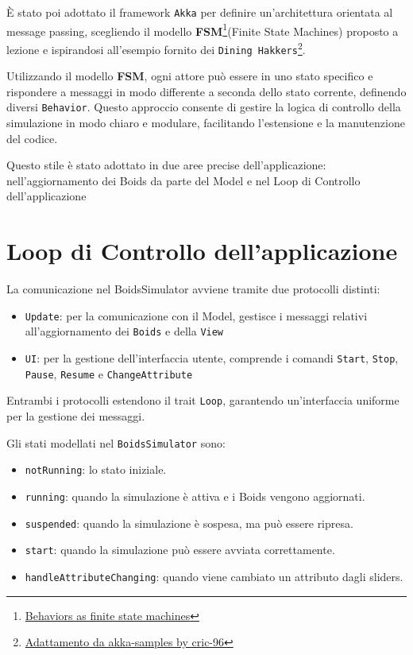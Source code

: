 \documentclass[a4paper,12pt]{report}
\begin{document}
    È stato poi adottato il framework \texttt{Akka} per definire un'architettura orientata al message passing, scegliendo il modello \textbf{FSM}\footnote{\href{https://doc.akka.io/libraries/akka-core/current/typed/fsm.html}{Behaviors as finite state machines}}(Finite State Machines) proposto a lezione e ispirandosi all'esempio fornito dei \texttt{Dining Hakkers}\footnote{\href{https://github.com/cric96/pcd-lab-akka-actors/blob/63e4f3273ef1550c1c744d1f7332b7ce935223ab/src/main/scala/it/unibo/pcd/akka/basics/e07fsm/DiningHakkers.scala}{Adattamento da akka-samples by cric-96}}.
    
    Utilizzando il modello \textbf{FSM}, ogni attore può essere in uno stato specifico e rispondere a messaggi in modo differente a seconda dello stato corrente, definendo diversi  \texttt{Behavior}. Questo approccio consente di gestire la logica di controllo della simulazione in modo chiaro e modulare, facilitando l'estensione e la manutenzione del codice.

    Questo stile è stato adottato in due aree precise dell'applicazione: nell'aggiornamento dei Boids da parte del Model e nel Loop di Controllo dell'applicazione
    
    \section{Loop di Controllo dell'applicazione}
        La comunicazione nel BoidsSimulator avviene tramite due protocolli distinti:
        \begin{itemize}
            \item \texttt{Update}: per la comunicazione con il Model, gestisce i messaggi relativi all'aggiornamento dei \texttt{Boids} e della \texttt{View} 
            \item \texttt{UI}: per la gestione dell'interfaccia utente, comprende i comandi \texttt{Start}, \texttt{Stop}, \texttt{Pause}, \texttt{Resume} e \texttt{ChangeAttribute}
        \end{itemize}

        Entrambi i protocolli estendono il trait \texttt{Loop}, garantendo un'interfaccia uniforme per la gestione dei messaggi.

        Gli stati modellati nel \texttt{BoidsSimulator} sono:
        \begin{itemize}
            \item \texttt{notRunning}: lo stato iniziale.
            \item \texttt{running}: quando la simulazione è attiva e i Boids vengono aggiornati.
            \item \texttt{suspended}: quando la simulazione è sospesa, ma può essere ripresa.
            \item \texttt{start}: quando la simulazione può essere avviata correttamente.
            \item \texttt{handleAttributeChanging}: quando viene cambiato un attributo dagli sliders.
        \end{itemize}
        
\end{document}
